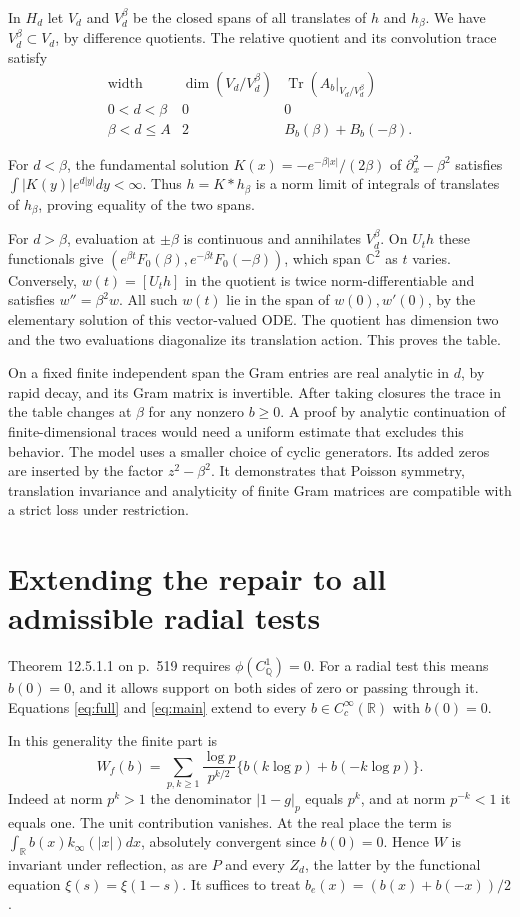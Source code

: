 \documentclass[11pt,letterpaper]{article}
\newcommand{\R}{\mathbb R}\newcommand{\Q}{\mathbb Q}\newcommand{\C}{\mathbb C}
\newcommand{\Tr}{\operatorname{Tr}}\newcommand{\supp}{\operatorname{supp}}
\newcommand{\partpage}[2]{\clearpage\section{#1}\label{#2}}
\begin{document}
In \(H_d\) let \(V_d\) and \(V_d^\beta\) be the closed spans of all translates of \(h\) and \(h_\beta\). We have \(V_d^\beta\subset V_d\), by difference quotients. The relative quotient and its convolution trace satisfy
\[
 \begin{array}{c|c|c}
 \text{width}&\dim(V_d/V_d^\beta)&\Tr(A_b|_{V_d/V_d^\beta})\\ \hline
 0<d<\beta &0&0\\
 \beta<d\le A&2&B_b(\beta)+B_b(-\beta).
 \end{array}
\]

For \(d<\beta\), the fundamental solution \(K(x)=-e^{-\beta|x|}/(2\beta)\) of \(\partial_x^2-\beta^2\) satisfies \(\int |K(y)|e^{d|y|}dy<\infty\). Thus \(h=K*h_\beta\) is a norm limit of integrals of translates of \(h_\beta\), proving equality of the two spans.

For \(d>\beta\), evaluation at \(\pm\beta\) is continuous and annihilates \(V_d^\beta\). On \(U_t h\) these functionals give \((e^{\beta t}F_0(\beta),e^{-\beta t}F_0(-\beta))\), which span \(\C^2\) as \(t\) varies. Conversely, \(w(t)=[U_t h]\) in the quotient is twice norm-differentiable and satisfies \(w''=\beta^2w\). All such \(w(t)\) lie in the span of \(w(0),w'(0)\), by the elementary solution of this vector-valued ODE. The quotient has dimension two and the two evaluations diagonalize its translation action. This proves the table.

On a fixed finite independent span the Gram entries are real analytic in \(d\), by rapid decay, and its Gram matrix is invertible. After taking closures the trace in the table changes at \(\beta\) for any nonzero \(b\ge0\). A proof by analytic continuation of finite-dimensional traces would need a uniform estimate that excludes this behavior. The model uses a smaller choice of cyclic generators. Its added zeros are inserted by the factor \(z^2-\beta^2\). It demonstrates that Poisson symmetry, translation invariance and analyticity of finite Gram matrices are compatible with a strict loss under restriction.

\partpage{Extending the repair to all admissible radial tests}{sec:two}
Theorem 12.5.1.1 on p.~519 requires \(\phi(C_\Q^1)=0\). For a radial test this means \(b(0)=0\), and it allows support on both sides of zero or passing through it. Equations \eqref{eq:full} and \eqref{eq:main} extend to every \(b\in C_c^\infty(\R)\) with \(b(0)=0\).

In this generality the finite part is
\[
 W_f(b)=\sum_{p,k\ge1}\frac{\log p}{p^{k/2}}
         \{b(k\log p)+b(-k\log p)\}.
\]
Indeed at norm \(p^k>1\) the denominator \(|1-g|_p\) equals \(p^k\), and at norm \(p^{-k}<1\) it equals one. The unit contribution vanishes. At the real place the term is \(\int_\R b(x)k_\infty(|x|)dx\), absolutely convergent since \(b(0)=0\). Hence \(W\) is invariant under reflection, as are \(P\) and every \(Z_d\), the latter by the functional equation \(\xi(s)=\xi(1-s)\). It suffices to treat \(b_e(x)=(b(x)+b(-x))/2\).
\end{document}
